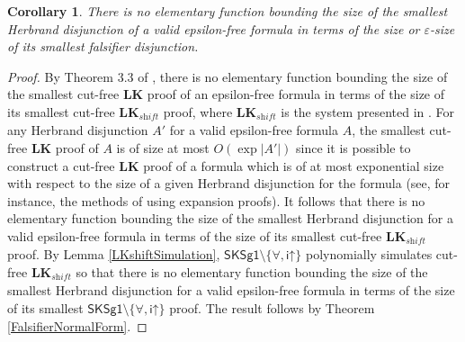 \documentclass[10pt]{article}
\newtheorem{corollary}[theorem]{Corollary}
\theoremstyle{definition}\newtheorem{remark}[theorem]{Remark}
\theoremstyle{definition}\newtheorem{example}[theorem]{Example}
\theoremstyle{definition}\newtheorem{definition}[theorem]{Definition}
\newcommand{\SKSq}{{\mathsf{SKSg1}}}
\newcommand{\iUp}{{\mathsf{i\mathord\uparrow}}}
\begin{document}
	\begin{corollary}\label{FalsifierDisjunctionsSmallerThanHerbrand}
		There is no elementary function bounding the size of the smallest Herbrand disjunction of a valid epsilon-free formula in terms of the size or $\varepsilon$-size of its smallest falsifier disjunction.
	\end{corollary}
		
	\begin{proof}
		By Theorem 3.3 of \cite{BaazUnsoundInferences}, there is no elementary function bounding the size of the smallest cut-free \textbf{LK} proof of an epsilon-free formula in terms of the size of its smallest cut-free $\textbf{LK}_\textit{shift}$ proof, where $\textbf{LK}_\textit{shift}$ is the system presented in \cite{BaazUnsoundInferences}. For any Herbrand disjunction $A'$ for a valid epsilon-free formula $A$, the smallest cut-free $\textbf{LK}$ proof of $A$ is of size at most $O(\exp | A' |)$ since it is possible to construct a cut-free \textbf{LK} proof of a formula which is of at most exponential size with respect to the size of a given Herbrand disjunction for the formula (see, for instance, the methods of \cite{BaazHetzlWellerProofDeskolemization} using expansion proofs). It follows that there is no elementary function bounding the size of the smallest Herbrand disjunction for a valid epsilon-free formula in terms of the size of its smallest cut-free $\textbf{LK}_\textit{shift}$ proof. By Lemma \ref{LKshiftSimulation}, $\SKSq \setminus \{\forall, \iUp\}$ polynomially simulates cut-free $\textbf{LK}_\textit{shift}$ so that there is no elementary function bounding the size of the smallest Herbrand disjunction for a valid epsilon-free formula in terms of the size of its smallest $\SKSq \setminus \{\forall, \iUp\}$ proof. The result follows by Theorem \ref{FalsifierNormalForm}.
	\end{proof}
\end{document}
